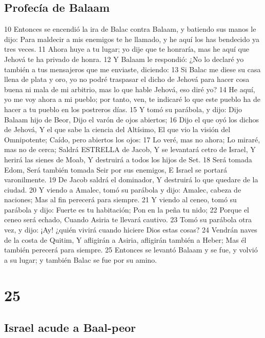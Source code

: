 \section*{Profecía de Balaam}

10 Entonces se encendió la ira de Balac contra Balaam, y batiendo sus manos le dijo: Para maldecir a mis enemigos te he llamado, y he aquí los has bendecido ya tres veces.
11 Ahora huye a tu lugar; yo dije que te honraría, mas he aquí que Jehová te ha privado de honra.
12 Y Balaam le respondió: ¿No lo declaré yo también a tus mensajeros que me enviaste, diciendo:
13 Si Balac me diese su casa llena de plata y oro, yo no podré traspasar el dicho de Jehová para hacer cosa buena ni mala de mi arbitrio, mas lo que hable Jehová, eso diré yo?
14 He aquí, yo me voy ahora a mi pueblo; por tanto, ven, te indicaré lo que este pueblo ha de hacer a tu pueblo en los postreros días.
15 Y tomó su parábola, y dijo:
Dijo Balaam hijo de Beor,
Dijo el varón de ojos abiertos;
16 Dijo el que oyó los dichos de Jehová,
Y el que sabe la ciencia del Altísimo,
El que vio la visión del Omnipotente;
Caído, pero abiertos los ojos:
17 Lo veré, mas no ahora;
Lo miraré, mas no de cerca;
Saldrá ESTRELLA de Jacob,
Y se levantará cetro de Israel,
Y herirá las sienes de Moab,
Y destruirá a todos los hijos de Set.
18 Será tomada Edom,
Será también tomada Seir por sus enemigos,
E Israel se portará varonilmente.
19 De Jacob saldrá el dominador,
Y destruirá lo que quedare de la ciudad.
20 Y viendo a Amalec, tomó su parábola y dijo: 
Amalec, cabeza de naciones; 
Mas al fin perecerá para siempre. 
21 Y viendo al ceneo, tomó su parábola y dijo: 
Fuerte es tu habitación; 
Pon en la peña tu nido; 
22 Porque el ceneo será echado, 
Cuando Asiria te llevará cautivo. 
23 Tomó su parábola otra vez, y dijo: 
¡Ay! ¿quién vivirá cuando hiciere Dios estas cosas? 
24 Vendrán naves de la costa de Quitim, 
Y afligirán a Asiria, afligirán también a Heber; 
Mas él también perecerá para siempre. 
25 Entonces se levantó Balaam y se fue, 
y volvió a su lugar; y también Balac se fue por su amino.

\chapter{25}

\section*{Israel acude a Baal-peor }

